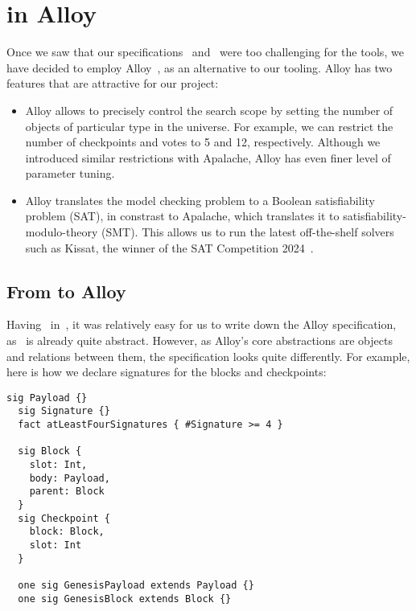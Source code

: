 
\section{\SpecThreeB{} in Alloy}\label{sec:alloy}

Once we saw that our specifications~\SpecThree{} and~\SpecFour{}
were too challenging for the \tlap{} tools, we have decided to employ
Alloy~\cite{jackson2012software,alloytools}, as an alternative to our tooling.
Alloy has two features that are attractive for our project:

\begin{itemize}

  \item Alloy allows to precisely control the search scope by setting the
      number of objects of particular type in the universe. For example, we can
      restrict the number of checkpoints and votes to 5 and 12, respectively.
      Although we introduced similar restrictions with Apalache, Alloy has even
      finer level of parameter tuning.

  \item Alloy translates the model checking problem to a Boolean satisfiability
      problem (SAT), in constrast to Apalache, which translates it to satisfiability-modulo-theory (SMT).  This
      allows us to run the latest off-the-shelf solvers such as Kissat, the
      winner of the SAT Competition 2024~\cite{SAT-Competition-2024-solvers}.

\end{itemize}

\subsection{From \tlap{} to Alloy}

Having~\SpecThree{} in~\tlap{}, it was relatively easy for us to write down
the Alloy specification, as~\SpecThree{} is already quite abstract. However, as
Alloy's core abstractions are objects and relations between them, the
specification looks quite differently. For example, here is how we declare
signatures for the blocks and checkpoints:

\begin{lstlisting}[language=alloy,columns=fullflexible]
  sig Payload {}
  sig Signature {}
  fact atLeastFourSignatures { #Signature >= 4 }

  sig Block {
    slot: Int,
    body: Payload,
    parent: Block
  }
  sig Checkpoint {
    block: Block,
    slot: Int
  }

  one sig GenesisPayload extends Payload {}
  one sig GenesisBlock extends Block {}
\end{lstlisting}

